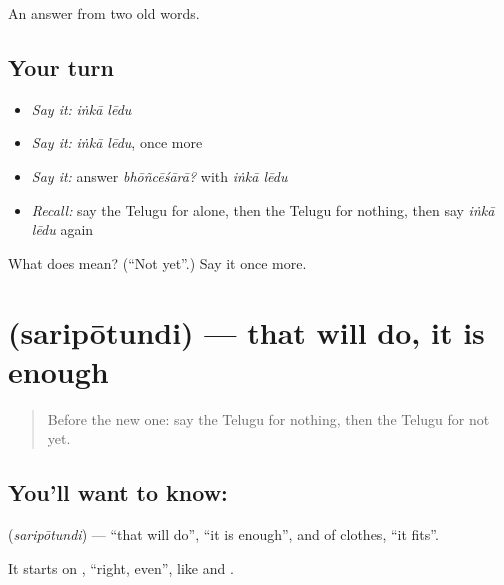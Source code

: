 \begin{grammarlens}[title={What you've built}]
An answer from two old words.
\end{grammarlens}

\subsection*{Your turn}
\begin{itemize}
\raggedright
  \item \emph{Say it:} \emph{iṅkā lēdu}
  \item \emph{Say it:} \emph{iṅkā lēdu}, once more
  \item \emph{Say it:} answer \emph{bhōñcēśārā?} with \emph{iṅkā lēdu}
  \item \emph{Recall:} say the Telugu for alone, then the Telugu for nothing, then say \emph{iṅkā lēdu} again
\end{itemize}

\begin{tcolorbox}[breakable,colback=teal!4,colframe=teal!35!black,title={Before you move on}]
What does   mean? (\textquotedblleft{}Not yet\textquotedblright{}.) Say it once more.
\end{tcolorbox}
\section[\texorpdfstring{\te{సరిపోతుంది} (saripōtundi)}{సరిపోతుంది (saripōtundi)}]{ (saripōtundi) — that will do, it is enough}

\label{lesson:TE-C98-enough}



\begin{quote}
Before the new one: say the Telugu for nothing, then the Telugu for not yet.
\end{quote}

\subsection*{You'll want to know: }
\textbf{} (\emph{saripōtundi}) — \textquotedblleft{}that will do\textquotedblright{}, \textquotedblleft{}it is enough\textquotedblright{}, and of clothes, \textquotedblleft{}it fits\textquotedblright{}.

It starts on \textbf{}, \textquotedblleft{}right, even\textquotedblright{}, like \textbf{} and \textbf{}.


